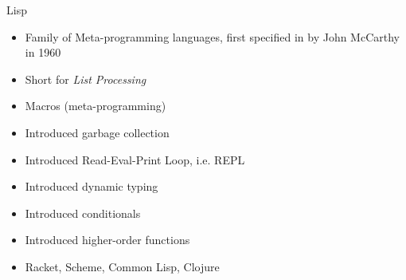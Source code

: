 \documentclass[pdf]{beamer}
\begin{document}
\begin{frame}{Lisp}
  \begin{figure}[H]
    \centering
    \hspace{0.3cm}
  \end{figure}
  \begin{itemize}
  \item Family of Meta-programming languages, first specified in by John McCarthy in 1960
  \item Short for \textit{List Processing}
  \item Macros (meta-programming)
  \item Introduced garbage collection
  \item Introduced Read-Eval-Print Loop, i.e. REPL
  \item Introduced dynamic typing
  \item Introduced conditionals
  \item Introduced higher-order functions
  \item Racket, Scheme, Common Lisp, Clojure
  \end{itemize}
\end{frame}
\end{document}
